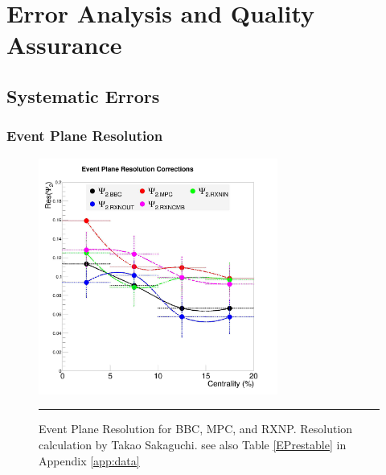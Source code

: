 
\chapter{Error Analysis and Quality Assurance} %

\section{Systematic Errors}
\subsection{Event Plane Resolution}
\begin{figure}[htbp]
  \centering
    \includegraphics[width=0.7\textwidth]{evtQA/EPresr8da.jpg}
    \rule{35em}{0.5pt}
  \caption[Event Plane Resolution for BBC, MPC, and RXNP.]{Event Plane Resolution for BBC, MPC, and RXNP. Resolution calculation by Takao Sakaguchi\citep{pi0v2run8dau}. see also Table \ref{EPrestable} in Appendix \ref{app:data}}
  \label{fig:EPres}
\end{figure}
